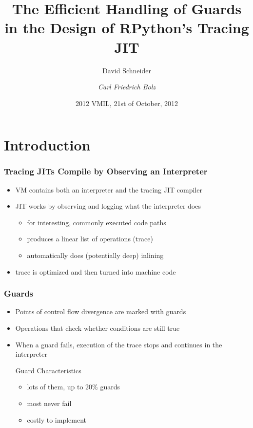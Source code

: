\documentclass[utf8x]{beamer}
\title{The Efficient Handling of Guards in the Design of RPython's Tracing JIT}
\author[David Schneider, Carl Friedrich Bolz]{David Schneider \and \emph{Carl Friedrich Bolz}}
\institute[Heinrich-Heine-Universität Düsseldorf]{
Heinrich-Heine-Universität Düsseldorf, STUPS Group, Germany
}
\date{2012 VMIL, 21st of October, 2012}
\begin{document}
\begin{frame}
  \titlepage
\end{frame}

\section{Introduction}

\begin{frame}
  \frametitle{Tracing JITs Compile by Observing an Interpreter}
  \begin{itemize}
      \item VM contains both an interpreter and the tracing JIT compiler
      \item JIT works by observing and logging what the interpreter does
      \begin{itemize}
          \item for interesting, commonly executed code paths
          \item produces a linear list of operations (trace)
          \item automatically does (potentially deep) inlining
      \end{itemize}
      \item trace is optimized and then turned into machine code
  \end{itemize}
\end{frame}

\begin{frame}
  \frametitle{Guards}
  \begin{itemize}
      \item Points of control flow divergence are marked with guards
      \item Operations that check whether conditions are still true
      \item When a guard fails, execution of the trace stops and continues in the interpreter
      \pause
      \begin{block}{Guard Characteristics}
          \begin{itemize}
              \item lots of them, up to 20\% guards
              \item most never fail
              \item costly to implement
          \end{itemize}
      \end{block}
  \end{itemize}
\end{frame}
\end{document}
